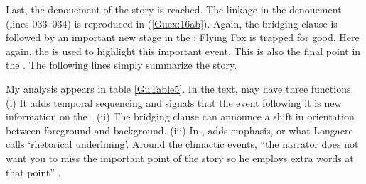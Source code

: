 \documentclass[output=paper]{LSP/langsci}
\begin{document}
Last, the denouement of the story is reached. The linkage in the denouement (lines 033--034) is reproduced in (\ref{Guex:16ab}). Again, the bridging clause is followed by an important new stage in the : Flying Fox is trapped for good. Here again, the   is used to highlight this important event. This is also the final point in the . The following lines simply summarize the story. 

My analysis appears in table \ref{GuTable5}. In the  text,  may have three functions. (i) It adds temporal sequencing and signals that the event following it is new information on the . (ii) The bridging clause can announce a shift in orientation between foreground and background.  (iii) In ,  adds emphasis, or what Longacre calls `rhetorical underlining'. Around the climactic events, ``the narrator does not want you to miss the important point of the story so he employs extra words at that point'' \citep[][26]{longacre83}. 
\end{document}
